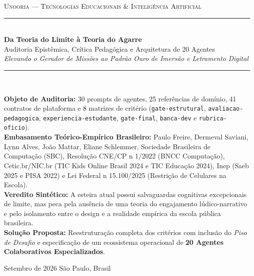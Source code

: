 \documentclass[11pt,a4paper]{article}
\begin{document}

\begin{titlepage}
\centering
\vspace*{1.5cm}

{\color{SteelBlue}\large\scshape Unooria --- Tecnologias Educacionais \& Intelig\^encia Artificial}\\[0.3cm]
{\color{BorderGray}\rule{0.85\textwidth}{1.5pt}}\\[0.8cm]

{\Huge\bfseries\color{NavyBlue} Da Teoria do Limite \`a Teoria do Agarre}\\[0.4cm]
{\LARGE\color{SteelBlue} Auditoria Epist\^emica, Cr\'itica Pedag\'ogica e Arquitetura de 20 Agentes}\\[0.3cm]
{\Large\itshape Elevando o Gerador de Miss\~oes ao Padr\~ao Ouro de Imers\~ao e Letramento Digital}\\[1.2cm]

{\color{BorderGray}\rule{0.85\textwidth}{0.8pt}}\\[0.8cm]

\begin{minipage}{0.85\textwidth}
\centering
\small
\textbf{Objeto de Auditoria:} 30 prompts de agentes, 25 refer\^encias de dom\'inio, 41 contratos de plataforma e 8 matrizes de crit\'erio (\texttt{gate-estrutural}, \texttt{avaliacao-pedagogica}, \texttt{experiencia-estudante}, \texttt{gate-final}, \texttt{banca-dev} e \texttt{rubrica-oficio}).\\[0.3cm]
\textbf{Embasamento Te\'orico-Emp\'irico Brasileiro:} Paulo Freire, Dermeval Saviani, Lynn Alves, Jo\~ao Mattar, Eliane Schlemmer, Sociedade Brasileira de Computa\c{c}\~ao (SBC), Resolu\c{c}\~ao CNE/CP n\textordmasculine{} 1/2022 (BNCC Computa\c{c}\~ao), Cetic.br/NIC.br (TIC Kids Online Brasil 2024 e TIC Educa\c{c}\~ao 2024), Inep (Saeb 2025 e PISA 2022) e Lei Federal n\textordmasculine{} 15.100/2025 (Restri\c{c}\~ao de Celulares na Escola).\\[0.3cm]
\textbf{Veredito Sint\'etico:} A esteira atual possui salvaguardas cognitivas excepcionais de limite, mas peca pela aus\^encia de uma teoria do engajamento l\'udico-narrativo e pelo isolamento entre o design e a realidade emp\'irica da escola p\'ublica brasileira.\\[0.3cm]
\textbf{Solu\c{c}\~ao Proposta:} Reestrutura\c{c}\~ao completa dos crit\'erios com inclus\~ao do \emph{Piso de Desafio} e especifica\c{c}\~ao de um ecossistema operacional de \textbf{20 Agentes Colaborativos Especializados}.
\end{minipage}

\vfill
{\small\color{Charcoal} Setembro de 2026 \quad\textbullet\quad S\~ao Paulo, Brasil}
\end{titlepage}
\end{document}
